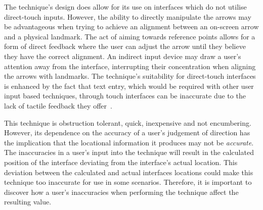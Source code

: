 \documentclass{bmcart}
\begin{document}
The technique's design does allow for its use on interfaces which do not utilise direct-touch inputs.
However, the ability to directly manipulate the arrows may be advantageous when trying to achieve an alignment between an on-screen arrow and a physical landmark. 
The act of aiming towards reference points allows for a form of direct feedback where the user can adjust the arrow until they believe they have the correct alignment.  
An indirect input device may draw a user's attention away from the interface, interrupting their concentration when aligning the arrows with landmarks.
The technique's suitability for direct-touch interfaces is enhanced by the fact that text entry, which would be required with other user input based techniques, through touch interfaces can be inaccurate due to the lack of tactile feedback they offer~\cite{Weiss2009}.

This technique is obstruction tolerant, quick, inexpensive and not encumbering.
However, its dependence on the accuracy of a user's judgement of direction has the implication that the locational information it produces may not be \textit{accurate}.
The inaccuracies in a user's input into the technique will result in the calculated position of the interface deviating from the interface's actual location.
This deviation between the calculated and actual interfaces locations could make this technique too inaccurate for use in some scenarios.
Therefore, it is important to discover how a user's inaccuracies when performing the technique affect the resulting value.



\end{document}
